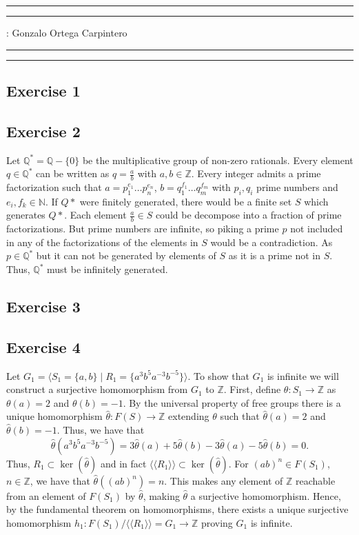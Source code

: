 \documentclass[11pt,a4paper]{article}
\newcommand{\Z}{\mathbb Z}
\newcommand{\Q}{\mathbb Q}
\newcommand{\N}{\mathbb N}
\begin{document}
\hrule\hrule
\vspace{1mm}


\vspace{1mm}

 : Gonzalo Ortega Carpintero
\vspace{2mm}

\hrule\hrule

\subsection*{Exercise 1}

\subsection*{Exercise 2}
Let $ \Q^* = \Q - \{0\} $ be the multiplicative group of non-zero rationals. Every element $ q \in \Q^* $ can be written as $ q = \frac{a}{b} $ with $ a, b \in \Z $. Every integer admits a prime factorization such that $ a = p_1^{e_1} \dots p_n^{e_n} $, $ b = q_1^{f_1} \dots q_m^{f_m} $ with $p_i, q_i $ prime numbers and $ e_i, f_k \in \N$. If $Q*$ were finitely generated, there would be a finite set $ S $ which generates $Q*$. Each element  $ \frac{a}{b} \in S $ could be decompose into a fraction of prime factorizations. But prime numbers are infinite, so piking a prime $ p $ not included in any of the factorizations of the elements in $ S $ would be a contradiction. As $ p \in \Q^*$ but it can not be generated by elements of $ S $ as it is a prime not in $ S $. Thus, $ \Q^*$ must be infinitely generated.

\subsection*{Exercise 3}

\subsection*{Exercise 4}
Let $ G_1 = \langle S_1 = \{a, b\} \mid R_1 = \{a^3 b^5 a^{-3} b^{-5}\} \rangle $. To show that $ G_1 $ is infinite we will construct a surjective homomorphism from $ G_1 $ to $ \Z $. First, define $ \theta \colon S_1 \to \Z $ as $ \theta(a) = 2 $ and $ \theta(b) = -1 $. By the universal property of free groups there is a unique homomorphism $ \hat \theta \colon F(S) \to \Z $ extending $ \theta $ such that $ \hat \theta(a) = 2 $ and $ \hat \theta(b) = -1 $. Thus, we have that
$$
  \hat \theta (a^3 b^5 a^{-3} b^{-5}) = 3 \hat\theta(a) + 5 \hat\theta(b) - 3 \hat\theta(a) - 5 \hat\theta(b) = 0.
$$
Thus, $ R_1 \subset \ker (\hat \theta) $ and in fact $ \langle \langle R_1 \rangle \rangle \subset \ker (\hat \theta) $. For $ (ab)^n \in F(S_1)$, $ n \in \Z $, we have that $ \hat \theta((ab)^n) = n $. This makes any element of $\Z$ reachable from an element of $ F(S_1) $ by $ \hat \theta $, making $ \hat \theta $ a surjective homomorphism. Hence, by the fundamental theorem on homomorphisms, there exists a unique surjective homomorphism $ h_1: F(S_1)/\langle \langle R_1 \rangle \rangle = G_1 \to \Z $ proving $ G_1 $ is infinite.
\end{document}
